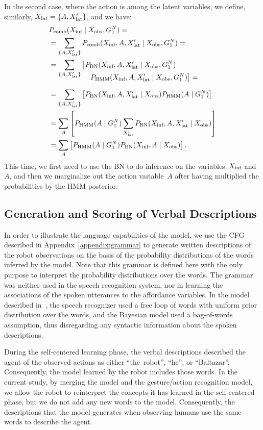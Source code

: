 In the second case, where the action is among the latent variables, we define, similarly, $X_\text{lat} = \{A, X_\text{lat}^\prime\}$, and we have:
\begin{align} \label{eq:fusion_including_action}
  & \pcomb(\xinf \given \xobs, G_1^N) = \nonumber \\
  &= \sum_{\{A,\xlat^\prime\}} \pcomb(\xinf, A, \xlat^\prime \given \xobs, G_1^N)= \nonumber \\
  &= \sum_{\{A,\xlat^\prime\}} \left[\pbn(\xinf, A, \xlat^\prime \given \xobs, G_1^N)\right. \nonumber \\[-4mm]
    & \mspace{100mu} \left.\phmm(\xinf, A, \xlat^\prime \given \xobs, G_1^N)\right]= \nonumber \\[2mm]
  &= \sum_{\{A,\xlat^\prime\}} \left[\pbn(\xinf, A, \xlat^\prime \given \xobs) \phmm(A \given G_1^N)\right] \nonumber \\
  &= \sum_{A}\left[\phmm(A \given G_1^N)\sum_{\xlat^\prime} \pbn(\xinf, A, \xlat^\prime \given \xobs)\right] \nonumber \\
  &= \sum_{A}\left[\phmm(A \given G_1^N) \pbn(\xinf, A \given \xobs)\right].
\end{align}
This time, we first need to use the \ac{BN} to do inference on the variables~$X_\text{inf}$ and~$A$, and then we marginalize out the action variable~$A$ after having multiplied the probabilities by the \ac{HMM} posterior.

\subsection{Generation and Scoring of Verbal Descriptions}
\label{sec:approach:verbal}

In order to illustrate the language capabilities of the model, we use the \ac{CFG} described in Appendix~\ref{appendix:grammar} to generate written descriptions of the robot observations on the basis of the probability distributions of the words inferred by the model.
Note that this grammar is defined here with the only purpose to interpret the probability distributions over the words.
The grammar was neither used in the speech recognition system, nor in learning the associations of the spoken utterances to the affordance variables.
In the model described in~\cite{salvi:2012:smcb}, the speech recognizer used a free loop of words with uniform prior distribution over the words, and the Bayesian model used a bag-of-words assumption, thus disregarding any syntactic information about the spoken descriptions.

During the self-centered learning phase, the verbal descriptions described the agent of the observed actions as either ``the~robot'', ``he'', or ``Baltazar''.
Consequently, the \AffWords{} model learned by the robot includes those words.
In the current study, by merging the \AffWords{} model and the gesture/action recognition model, we allow the robot to reinterpret the concepts it has learned in the self-centered phase, but we do not add any new words to the model.
Consequently, the descriptions that the model generates when observing humans use the same words to describe the agent.

